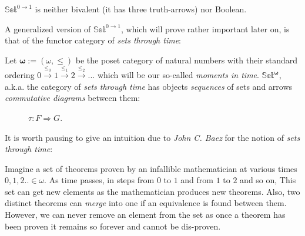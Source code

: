 	\begin{remark}
		 $\mathbb{Set}^{0 \rightarrow 1}$ is neither bivalent (it has three truth-arrows) nor Boolean.
	\end{remark}

\newpage
A generalized version of $\mathbb{Set}^{0 \rightarrow 1}$, which will prove rather important later on, is that of the functor category of \emph{sets through time}:

\begin{ex}
	Let $\mathbf{\omega}:=(\omega, \leq) $ be the poset category of natural numbers with their standard ordering $0 \xrightarrow{\leq_0} 1 \xrightarrow{\leq_1} 2 \xrightarrow{\leq_2}...$ which will be our so-called \emph{moments in time}. \newline 
	$\mathbb{Set}^\mathbf{\omega}$, a.k.a. the category of \emph{sets through time} has objects \emph{sequences} of sets and arrows \emph{commutative diagrams} between them:
	
	\begin{figure}[h]
		\centering
		\caption{$\tau : F \Rightarrow G$.}
	\end{figure}  
	
	 It is worth pausing to give an intuition due to \emph{John C. Baez} for the notion of \emph{sets through time}:
	
	\begin{remark}
		Imagine a set of theorems proven by an infallible mathematician at various times $0,1,2.. \in \omega$.\newline
		As time passes, in steps from $0$ to $1$ and from $1$ to $2$ and so on, This set can get new elements as the mathematician produces new theorems.\newline
		Also, two distinct theorems can \emph{merge} into one if an equivalence is found between them. \newline
		However, we can never remove an element from the set as once a theorem has been proven it remains so forever and cannot be dis-proven.  
	\end{remark}
	

\end{ex}
